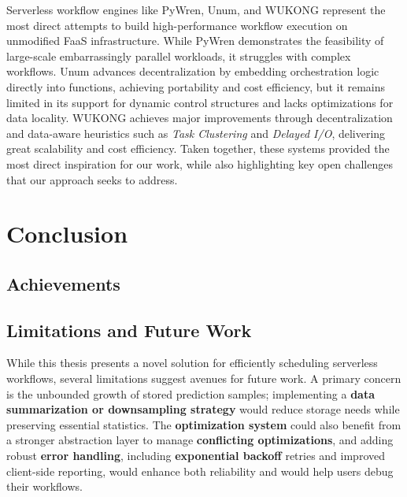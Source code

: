 \documentclass[conference]{IEEEtran}
\begin{document}
Serverless workflow engines like PyWren, Unum, and WUKONG represent the most direct attempts to build high-performance workflow execution on unmodified FaaS infrastructure. While PyWren demonstrates the feasibility of large-scale embarrassingly parallel workloads, it struggles with complex workflows. Unum advances decentralization by embedding orchestration logic directly into functions, achieving portability and cost efficiency, but it remains limited in its support for dynamic control structures and lacks optimizations for data locality. WUKONG achieves major improvements through decentralization and data-aware heuristics such as \textit{Task Clustering} and \textit{Delayed I/O}, delivering great scalability and cost efficiency. Taken together, these systems provided the most direct inspiration for our work, while also highlighting key open challenges that our approach seeks to address.


\section{Conclusion}
\subsection{Achievements}

\subsection{Limitations and Future Work}

While this thesis presents a novel solution for efficiently scheduling serverless workflows, several limitations suggest avenues for future work. A primary concern is the unbounded growth of stored prediction samples; implementing a \textbf{data summarization or downsampling strategy} would reduce storage needs while preserving essential statistics. The \textbf{optimization system} could also benefit from a stronger abstraction layer to manage \textbf{conflicting optimizations}, and adding robust \textbf{error handling}, including \textbf{exponential backoff} retries and improved client-side reporting, would enhance both reliability and would help users debug their workflows.
\end{document}
